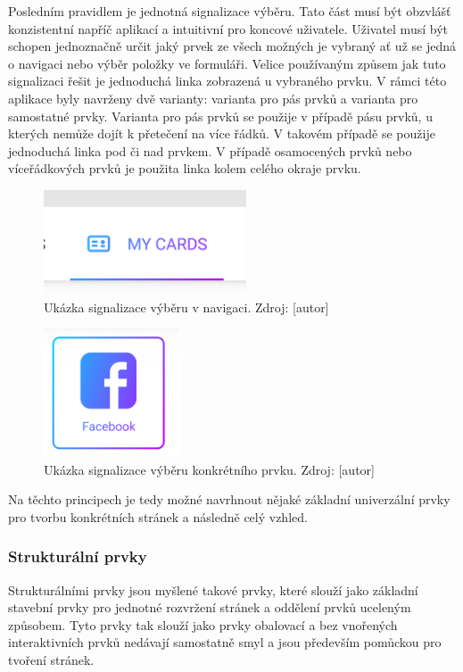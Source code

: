 		Posledním pravidlem je jednotná signalizace výběru.
		Tato část musí být obzvlášť konzistentní napříč aplikací a intuitivní pro koncové uživatele.
		Uživatel musí být schopen jednoznačně určit jaký prvek ze všech možných je vybraný ať už se jedná o navigaci
		nebo výběr položky ve formuláři.
		Velice používaným způsem jak tuto signalizaci řešit je jednoduchá linka zobrazená u vybraného prvku.
		V rámci této aplikace byly navrženy dvě varianty: varianta pro pás prvků a varianta pro samostatné prvky.
		Varianta pro pás prvků se použije v případě pásu prvků, u kterých nemůže dojít k přetečení na více řádků.
		V takovém případě se použije jednoduchá linka pod či nad prvkem.
		V případě osamocených prvků nebo víceřádkových prvků je použita linka kolem celého okraje prvku.

		\begin{figure}[H]
			\centering
			\includegraphics[width=6cm]{obrazky/ukazka_vyberu_1}\hfill
			\caption{Ukázka signalizace výběru v navigaci. Zdroj: [autor]}
		\end{figure}

		\begin{figure}[H]
			\centering
			\includegraphics[width=4cm]{obrazky/ukazka_vyberu_2}\hfill
			\caption{Ukázka signalizace výběru konkrétního prvku. Zdroj: [autor]}
		\end{figure}

		Na těchto principech je tedy možné navrhnout nějaké základní univerzální prvky pro tvorbu konkrétních stránek
		a následně celý vzhled.

		\subsubsection{Strukturální prvky}

		Strukturálními prvky jsou myšlené takové prvky, které slouží jako základní stavební prvky pro jednotné
		rozvržení stránek a oddělení prvků uceleným způsobem.
		Tyto prvky tak slouží jako prvky obalovací a bez vnořených interaktivních prvků nedávají samostatně smyl
		a jsou především pomůckou pro tvoření stránek.

